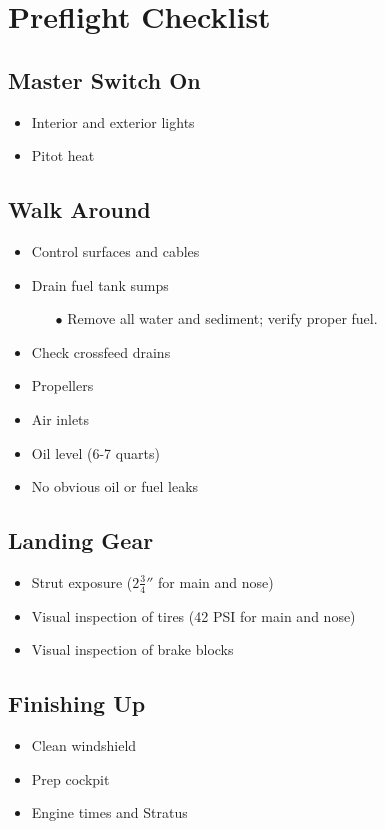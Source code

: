 \def\todoitem#1{
    \item[$\square$] #1 \dotfill
}

\section{Preflight Checklist}
\renewcommand{\rightmark}{Preflight Checklist}


\subsection{Master Switch On}

\begin{itemize}
    \todoitem{Interior and exterior lights}
    \todoitem{Pitot heat}
\end{itemize}

\subsection{Walk Around}

\begin{itemize}
    \todoitem{Control surfaces and cables}
    \todoitem{Drain fuel tank sumps}
    \begin{itemize}
        \item[$\bullet$] Remove all water and sediment; verify proper fuel.
    \end{itemize}
    \todoitem{Check crossfeed drains}
    \todoitem{Propellers}
    \todoitem{Air inlets}
    \todoitem{Oil level (6-7 quarts)}
    \todoitem{No obvious oil or fuel leaks}
\end{itemize}

\subsection{Landing Gear}

\begin{itemize}
    \todoitem{Strut exposure ($2\frac{3}{4}''$ for main and nose)}
    \todoitem{Visual inspection of tires (42 PSI for main and nose)}
    \todoitem{Visual inspection of brake blocks}
\end{itemize}

\subsection{Finishing Up}

\begin{itemize}
    \todoitem{Clean windshield}
    \todoitem{Prep cockpit}
    \todoitem{Engine times and Stratus}
\end{itemize}
